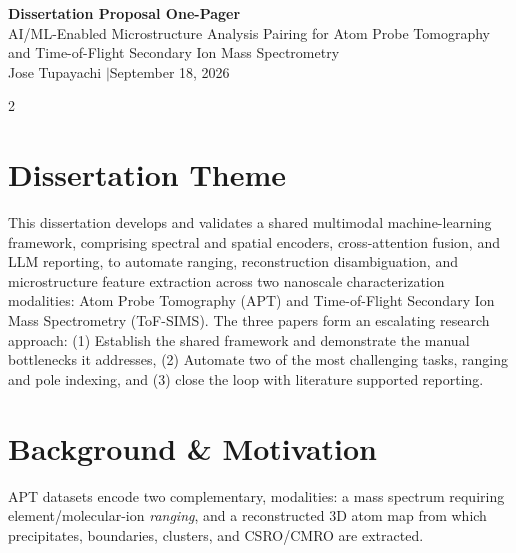 \documentclass[9pt]{extarticle}
\begin{document}
\begin{center}
{\Large\bfseries\color{orncblue} Dissertation Proposal One-Pager}\\[1pt]
{\normalsize AI/ML-Enabled Microstructure Analysis Pairing for Atom Probe Tomography and Time-of-Flight Secondary Ion Mass Spectrometry}\\[1pt]
{\footnotesize Jose Tupayachi \quad$\vert$\quad September 18, 2026}
\end{center}
\vspace{-4pt}

\begin{multicols}{2}

\section{Dissertation Theme}

This dissertation develops and validates a shared multimodal machine-learning framework, comprising spectral and spatial encoders, cross-attention fusion, and LLM reporting, to automate ranging, reconstruction disambiguation, and microstructure feature extraction across two nanoscale characterization modalities: Atom Probe Tomography (APT) and Time-of-Flight Secondary Ion Mass Spectrometry (ToF-SIMS). The three papers form an escalating research approach: (1) Establish the shared framework and demonstrate the manual bottlenecks it addresses, (2) Automate two of the most challenging tasks, ranging and pole indexing, and (3) close the loop with literature supported reporting.

\section{Background \& Motivation}

APT datasets encode two complementary, modalities: a mass spectrum requiring element/molecular-ion \emph{ranging}, and a reconstructed 3D atom map from which precipitates, boundaries, clusters, and CSRO/CMRO are extracted. \\


\end{multicols}
\end{document}

